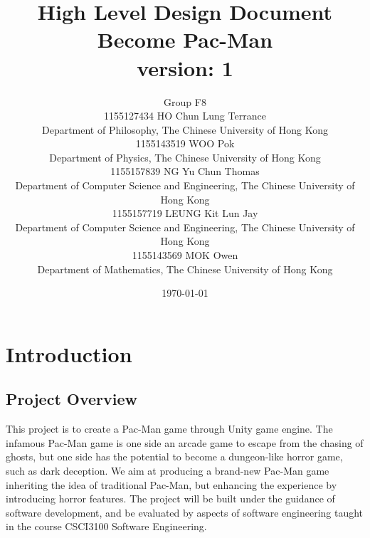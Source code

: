\documentclass{article}
\title{High Level Design Document\\Become Pac-Man\\version: 1}
\author{Group F8\\1155127434 HO Chun Lung Terrance\\
Department of Philosophy, The Chinese University of Hong Kong\\1155143519 WOO Pok\\
Department of Physics, The Chinese University of Hong Kong\\1155157839 NG Yu Chun Thomas\\
Department of Computer Science and Engineering, The Chinese University of Hong Kong\\1155157719 LEUNG Kit Lun Jay\\
Department of Computer Science and Engineering, The Chinese University of Hong Kong\\1155143569 MOK Owen\\
Department of Mathematics, The Chinese University of Hong Kong}
\date{\today}
\begin{document}
\maketitle
\tableofcontents
\newpage
\section{Introduction}
\subsection{Project Overview}
\par This project is to create a Pac-Man game through Unity game engine. The infamous Pac-Man game is one side an arcade game to escape from the chasing of ghosts, but one side has the potential to become a dungeon-like horror game, such as dark deception. We aim at producing a brand-new Pac-Man game inheriting the idea of traditional Pac-Man, but enhancing the experience by introducing horror features. The project will be built under the guidance of software development, and be evaluated by aspects of software engineering taught in the course CSCI3100 Software Engineering.
\end{document}
